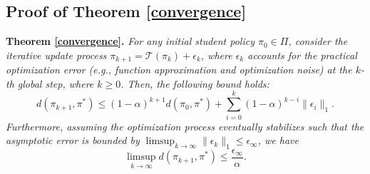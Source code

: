 \documentclass{article}
\theoremstyle{plain}
\theoremstyle{definition}
\theoremstyle{remark}
\begin{document}
\subsection{Proof of Theorem \ref{convergence}} \label{proof of convergence}
\textbf{Theorem \ref{convergence}.} \textit{
	For any initial student policy $\pi_0\in\Pi$, consider the iterative update process $\pi_{k+1}=\mathcal{T}(\pi_k)+\epsilon_k$, where $\epsilon_k$ accounts for the practical optimization error (e.g., function approximation and optimization noise) at the $k$-th global step, where $k\geq0$. Then, the following bound holds:
	\begin{equation}
		d(\pi_{k+1},\pi^*)\leq(1-\alpha)^{k+1}d(\pi_0,\pi^*)+\sum_{i=0}^{k}(1-\alpha)^{k-i}\lVert\epsilon_i\rVert_1.
	\end{equation}
	Furthermore, assuming the optimization process eventually stabilizes such that the asymptotic error is bounded by $\limsup_{k\rightarrow \infty}\lVert\epsilon_{k}\rVert_1\leq \epsilon_{\infty}$, we have
	\begin{equation}
		\limsup_{k \rightarrow \infty} d(\pi_{k+1}, \pi^*) \leq \frac{\epsilon_{\infty}}{\alpha}.
	\end{equation}
}
\end{document}
